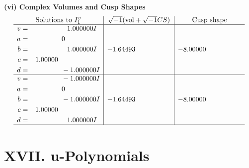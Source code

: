 \documentclass[1p]{elsarticle_modified}
\theoremstyle{definition}
\newcommand{\I}{\sqrt{-1}}
\begin{document}
\newpage\flushleft \textbf{(vi) Complex Volumes and Cusp Shapes}
$$\begin{array}{c|c|c}  
\text{Solutions to }I^v_{1}& \I (\text{vol} + \sqrt{-1}CS) & \text{Cusp shape}\\
 \hline 
\begin{aligned}
v &= \phantom{-0.000000 -}1.000000 I \\
a &= \phantom{-0.000000 } 0 \\
b &= \phantom{-0.000000 -}1.000000 I \\
c &= \phantom{-}1.00000\phantom{ +0.000000I} \\
d &= \phantom{-0.000000 } -1.000000 I\end{aligned}
 & -1.64493\phantom{ +0.000000I} & -8.00000\phantom{ +0.000000I} \\ \hline\begin{aligned}
v &= \phantom{-0.000000 } -1.000000 I \\
a &= \phantom{-0.000000 } 0 \\
b &= \phantom{-0.000000 } -1.000000 I \\
c &= \phantom{-}1.00000\phantom{ +0.000000I} \\
d &= \phantom{-0.000000 -}1.000000 I\end{aligned}
 & -1.64493\phantom{ +0.000000I} & -8.00000\phantom{ +0.000000I}\\
 \hline 
 \end{array}$$\newpage
\newpage\renewcommand{\arraystretch}{1}
\centering \section*{ XVII. u-Polynomials}
\end{document}
